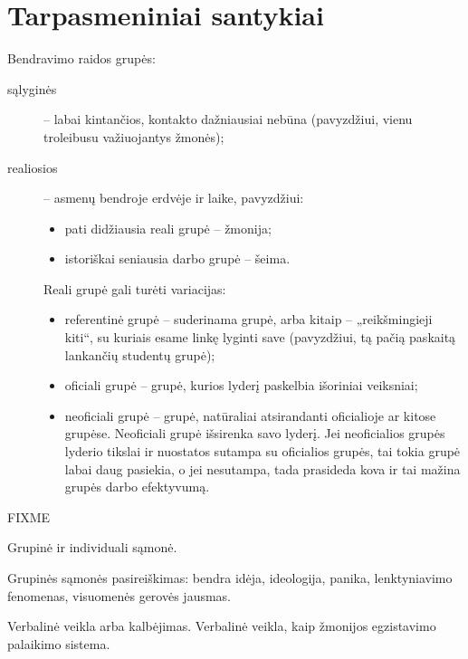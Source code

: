 \chapter{Tarpasmeniniai santykiai}

\label{tema:grupe}

Bendravimo raidos grupės:

\begin{description}
  \item[sąlyginės] – labai kintančios, kontakto dažniausiai nebūna 
    (pavyzdžiui, vienu troleibusu važiuojantys žmonės);
  \item[realiosios] – asmenų bendroje erdvėje ir laike, pavyzdžiui:
    \begin{itemize}
      \item pati didžiausia reali grupė – žmonija;
      \item istoriškai seniausia darbo grupė – šeima.
    \end{itemize}

    Reali grupė gali turėti variacijas:
    \begin{itemize}
      \item referentinė grupė – suderinama grupė, arba kitaip –
        „reikšmingieji kiti“, su kuriais esame linkę lyginti save 
        (pavyzdžiui, tą pačią paskaitą lankančių studentų grupė);
      \item oficiali grupė – grupė, kurios lyderį paskelbia išoriniai
        veiksniai;
      \item neoficiali grupė – grupė, natūraliai atsirandanti oficialioje
        ar kitose grupėse. Neoficiali grupė išsirenka savo lyderį. Jei
        neoficialios grupės lyderio tikslai ir nuostatos sutampa su
        oficialios grupės, tai tokia grupė labai daug pasiekia, o jei
        nesutampa, tada prasideda kova ir tai mažina grupės darbo 
        efektyvumą.
    \end{itemize}

\end{description}


FIXME

Grupinė ir individuali sąmonė.

Grupinės sąmonės pasireiškimas: bendra idėja, ideologija,
panika, lenktyniavimo fenomenas, visuomenės gerovės jausmas.

Verbalinė veikla arba kalbėjimas. Verbalinė veikla, kaip žmonijos 
egzistavimo palaikimo sistema.


